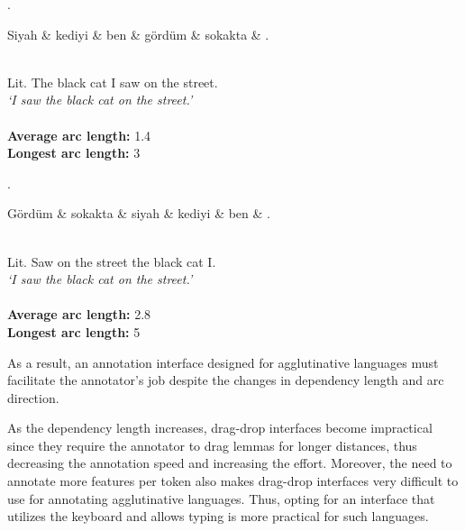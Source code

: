 \begin{multicols}{2}
\vspace*{\fill} 
\ex. \label{dep1}
\begin{dependency}
   \begin{deptext}
      Siyah \& kediyi \& ben \& gördüm \& sokakta \& . \\
   \end{deptext}
\end{dependency} \\
Lit. The black cat I saw on the street. \\
\textit{‘I saw the black cat on the street.’} \\
\vspace{.05cm} \\
\textbf{Average arc length:} 1.4\\
\textbf{Longest arc length:} 3\\
\columnbreak

\ex. \label{dep2}
\begin{dependency}
   \begin{deptext}
      Gördüm \& sokakta \& siyah \& kediyi \& ben \& . \\
   \end{deptext}
\end{dependency} \\
Lit. Saw on the street the black cat I. \\
\textit{‘I saw the black cat on the street.’} \\
\vspace{.05cm} \\
\textbf{Average arc length:} 2.8\\
\textbf{Longest arc length:} 5

\end{multicols}

As a result, an annotation interface designed for agglutinative languages must facilitate the annotator's job despite the changes in dependency length and arc direction. 

As the dependency length increases, drag-drop interfaces become impractical since they require the annotator to drag lemmas for longer distances, thus decreasing the annotation speed and increasing the effort. Moreover, the need to annotate more features per token also makes drag-drop interfaces very difficult to use for annotating agglutinative languages. Thus, opting for an interface that utilizes the keyboard and allows typing is more practical for such languages.

